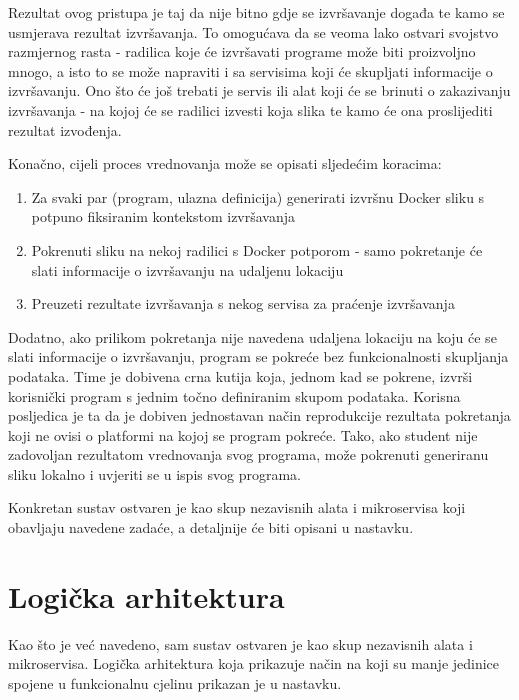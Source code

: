 \documentclass[times, utf8, zavrsni]{fer}
\begin{document}
Rezultat ovog pristupa je taj da nije bitno gdje se izvršavanje događa te kamo se usmjerava rezultat izvršavanja. To omogućava da se veoma lako ostvari svojstvo razmjernog rasta - radilica koje će izvršavati programe može biti proizvoljno mnogo, a isto to se može napraviti i sa servisima koji će skupljati informacije o izvršavanju. Ono što će još trebati je servis ili alat koji će se brinuti o zakazivanju izvršavanja - na kojoj će se radilici izvesti koja slika te kamo će ona proslijediti rezultat izvođenja.

Konačno, cijeli proces vrednovanja može se opisati sljedećim koracima:

\begin{enumerate}
\item Za svaki par (program, ulazna definicija) generirati izvršnu Docker sliku s potpuno fiksiranim kontekstom izvršavanja
\item Pokrenuti sliku na nekoj radilici s Docker potporom - samo pokretanje će slati informacije o izvršavanju na udaljenu lokaciju
\item Preuzeti rezultate izvršavanja s nekog servisa za praćenje izvršavanja
\end{enumerate}

Dodatno, ako prilikom pokretanja nije navedena udaljena lokaciju na koju će se slati informacije o izvršavanju, program se pokreće bez funkcionalnosti skupljanja podataka. Time je dobivena crna kutija koja, jednom kad se pokrene, izvrši korisnički program s jednim točno definiranim skupom podataka. Korisna posljedica je ta da je dobiven jednostavan način reprodukcije rezultata pokretanja koji ne ovisi o platformi na kojoj se program pokreće. Tako, ako student nije zadovoljan rezultatom vrednovanja svog programa, može pokrenuti generiranu sliku lokalno i uvjeriti se u ispis svog programa.

Konkretan sustav ostvaren je kao skup nezavisnih alata i mikroservisa koji obavljaju navedene zadaće, a detaljnije će biti opisani u nastavku.

\section{Logička arhitektura}

Kao što je već navedeno, sam sustav ostvaren je kao skup nezavisnih alata i mikroservisa. Logička arhitektura koja prikazuje način na koji su manje jedinice spojene u funkcionalnu cjelinu prikazan je u nastavku.
\end{document}
